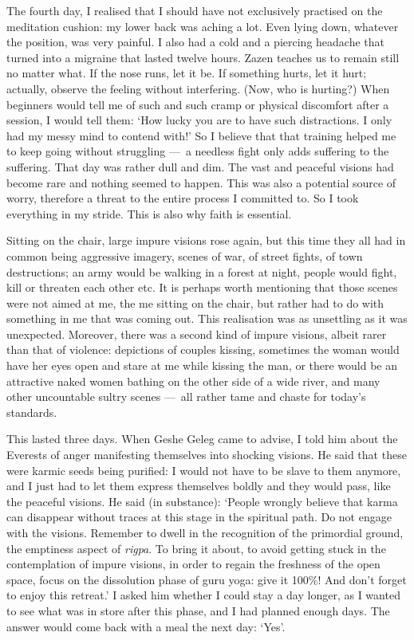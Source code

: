 \documentclass[11pt,twocolumn]{article}
\begin{document}
The fourth day, I realised that I should have not exclusively
practised on the meditation cushion: my lower back was aching a
lot. Even lying down, whatever the position, was very painful. I also
had a cold and a piercing headache that turned into a migraine that
lasted twelve hours. Zazen teaches us to remain still no matter
what. If the nose runs, let it be. If something hurts, let it hurt;
actually, observe the feeling without interfering. (Now, who is
hurting?)  When beginners would tell me of such and such cramp or
physical discomfort after a session, I would tell them: `How lucky you
are to have such distractions. I only had my messy mind to contend
with!' So I believe that that training helped me to keep going without
struggling ---~a needless fight only adds suffering to the
suffering. That day was rather dull and dim. The vast and peaceful
visions had become rare and nothing seemed to happen. This was also a
potential source of worry, therefore a threat to the entire process I
committed to. So I took everything in my stride. This is also why
faith is essential.

Sitting on the chair, large impure visions rose again, but this time
they all had in common being aggressive imagery, scenes of war, of
street fights, of town destructions; an army would be walking in a
forest at night, people would fight, kill or threaten each other
etc. It is perhaps worth mentioning that those scenes were not aimed
at me, the me sitting on the chair, but rather had to do with
something in me that was coming out. This realisation was as
unsettling as it was unexpected. Moreover, there was a second kind of
impure visions, albeit rarer than that of violence: depictions of
couples kissing, sometimes the woman would have her eyes open and
stare at me while kissing the man, or there would be an attractive
naked women bathing on the other side of a wide river, and many other
uncountable sultry scenes ---~all rather tame and chaste for today's
standards.

This lasted three days. When Geshe Geleg came to advise, I told him
about the Everests of anger manifesting themselves into shocking
visions. He said that these were karmic seeds being purified: I would
not have to be slave to them anymore, and I just had to let them
express themselves boldly and they would pass, like the peaceful
visions. He said (in substance): `People wrongly believe that karma
can disappear without traces at this stage in the spiritual path. Do
not engage with the visions. Remember to dwell in the recognition of
the primordial ground, the emptiness aspect of \emph{rigpa}. To bring
it about, to avoid getting stuck in the contemplation of impure
visions, in order to regain the freshness of the open space, focus on
the dissolution phase of guru yoga: give it 100\%! And don't forget to
enjoy this retreat.'  I asked him whether I could stay a day longer,
as I wanted to see what was in store after this phase, and I had
planned enough days. The answer would come back with a meal the next
day: `Yes'.
\end{document}
